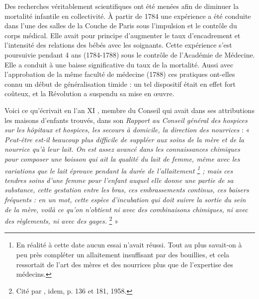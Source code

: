 Des recherches véritablement scientifiques ont été menées afin de diminuer la mortalité infantile en collectivité. À partir de 1784 une expérience a été conduite dans l'une des salles de la Couche de Paris sous l'impulsion et le contrôle du corps médical. Elle avait pour principe d'augmenter le taux d'encadrement et l'intensité des relations des bébés avec les soignants. Cette expérience s'est poursuivie pendant 4 ans (1784-1788) sous le contrôle de l'Académie de Médecine. Elle a conduit à une baisse significative du taux de la mortalité. Aussi avec l'approbation de la même faculté de médecine (1788) ces pratiques ont-elles connu un début de généralisation timide : un tel dispositif était en effet fort coûteux, et la Révolution a suspendu sa mise en œuvre.

 Voici ce qu'écrivait en l'an XI , membre du Conseil qui avait dans ses attributions les maisons d'enfants trouvés, dans son \emph{Rapport au Conseil général des hospices sur les hôpitaux et hospices, les secours à domicile, la direction des nourrices} : « \emph{Peut-être est-il beaucoup plus difficile de suppléer aux soins de la mère et de la nourrice qu'à leur lait. On est assez avancé dans les connaissances chimiques pour composer une boisson qui ait la qualité du lait de femme, même avec les variations que le lait éprouve pendant la durée de l'allaitement%
\footnote{En réalité à cette date aucun essai n'avait réussi. Tout au plus savait-on à peu près compléter un allaitement insuffisant par des bouillies, et cela ressortait de l'art des mères et des nourrices plus que de l'expertise des médecins.} 
; mais ces tendres soins d'une femme pour l'enfant auquel elle donne une partie de sa substance, cette gestation entre les bras, ces embrassements continus, ces baisers fréquents : en un mot, cette espèce d'incubation qui doit suivre la sortie du sein de la mère, voilà ce qu'on n'obtient ni avec des combinaisons chimiques, ni avec des règlements, ni avec des gages.}%
\footnote{Cité par , idem, p. 136 et 181, 1958.} »

  




